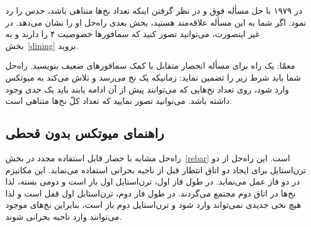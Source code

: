\documentclass{book}
\newcommand{\clearemptydoublepage}{\newpage\cleardoublepage}
\begin{document}
    در ۱۹۷۹  با حل مسأله فوق و در نظر گرفتن اینکه تعداد نخ‌ها متناهی باشد، حدس    را رد نمود\cite{morris}. 
    اگر شما به این مسأله علاقه‌مند هستید، بخش بعدی راه‌حل او را نشان می‌دهد. در غیر اینصورت، می‌توانید تصور کنید که سمافورها خصوصیت ۴ 
    را دارند و به بخش~\ref{dining} بروید. 

    معمّا: یک راه برای مسأله انحصار متقابل با کمک سمافورهای ضعیف بنویسید. راه‌حل شما باید شرط زیر را تضمین نماید: 
    زمانیکه یک نخ می‌رسد و تلاش می‌کند به میوتکس وارد شود،  روی تعداد نخ‌هایی که می‌توانند پیش از آن ادامه یابند باید یک حدی وجود داشته باشد. 
    می‌توانید تصور نمایید که تعداد کلّ نخ‌ها متناهی است. 

\clearemptydoublepage
\subsection{راهنمای میوتکس بدون قحطی}
\label{morris}

    راه‌حل  مشابه با حصار قابل استفاده مجدد در بخش~\ref{rebar} است. 
    این راه‌حل از دو ترن‌استایل برای ایجاد دو اتاق انتظار قبل از ناحیه بحرانی استفاده می‌نماید. این مکانیزم در دو فاز عمل می‌نماید. 
    در طول فاز اول، ترن‌استایل اول باز است و دومی بسته، لذا نخ‌ها در اتاق دوم مجتمع می‌گردند. در طول فاز دوم، ترن‌استایل اول قفل است  و لذا هیچ 
    نخی جدیدی نمی‌تواند وارد شود و ترن‌استایل دوم باز است، بنابراین نخ‌های موجود می‌توانند وارد ناحیه بحرانی شوند. 
\end{document}
